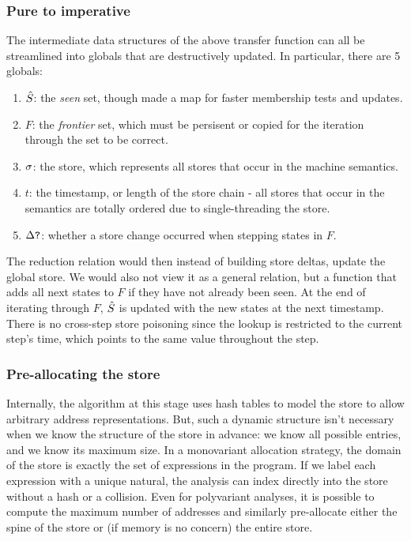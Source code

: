 \documentclass[preprint,onecolumn,9pt]{sigplanconf} %
\begin{document}
\subsubsection{Pure to imperative}

The intermediate data structures of the above transfer function can all be streamlined into globals that are destructively updated.
%
In particular, there are 5 globals:

\begin{enumerate}
\item{$\hat{S}$: the \emph{seen} set, though made a map for faster membership tests and updates.}
\item{$F$: the \emph{frontier} set, which must be persisent or copied for the iteration through the set to be correct.}
\item{$\sigma$: the store, which represents all stores that occur in the machine semantics.}
\item{$t$: the timestamp, or length of the store chain - all stores that occur in the semantics are totally ordered due to single-threading the store.}
\item{$\Delta\mbox{{\tt ?}}$: whether a store change occurred when stepping states in $F$.}
\end{enumerate}

The reduction relation would then instead of building store deltas, update the global store.
%
We would also not view it as a general relation, but a function that adds all next states to $F$ if they have
not already been seen.
%
At the end of iterating through $F$, $\hat{S}$ is updated with the new states at the next timestamp.
%
There is no cross-step store poisoning since the lookup is restricted to the current step's time, which points to the same value throughout the step.

\subsubsection{Pre-allocating the store}

Internally, the algorithm at this stage uses hash tables to model the store to allow arbitrary address representations.
%
But, such a dynamic structure isn't necessary when we know the structure of the store in advance: we know all possible entries, and we know its maximum size.
%
In a monovariant allocation strategy, the domain of the store is exactly the set of expressions in the program.
%
If we label each expression with a unique natural, the analysis can index directly into the store without a hash or a collision.
%
Even for polyvariant analyses, it is possible to compute the maximum number of addresses and similarly pre-allocate either the spine of the store or (if memory is no concern) the entire store.
\end{document}
